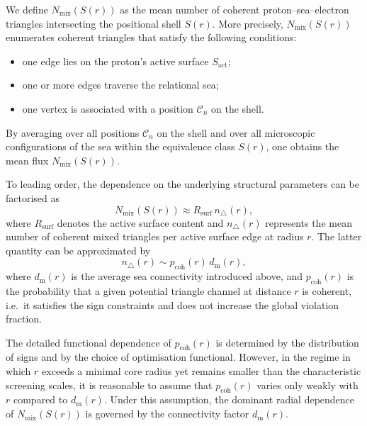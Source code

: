 \documentclass[11pt,a4paper]{article}
\begin{document}
We define $N_{\mathrm{mix}}(S(r))$ as the mean number of coherent proton–sea–electron triangles intersecting the positional shell $S(r)$.
More precisely, $N_{\mathrm{mix}}(S(r))$ enumerates coherent triangles that satisfy the following conditions:
\begin{itemize}
  \item one edge lies on the proton’s active surface $S_{\mathrm{act}}$;
  \item one or more edges traverse the relational sea;
  \item one vertex is associated with a position $\mathcal{C}_{n}$ on the shell.\cite{Laubscher2026SchrodingerSketch}
\end{itemize}
By averaging over all positions $\mathcal{C}_{n}$ on the shell and over all microscopic configurations of the sea within the equivalence class $S(r)$, one obtains the mean flux $N_{\mathrm{mix}}(S(r))$.

To leading order, the dependence on the underlying structural parameters can be factorised as
\begin{equation}
N_{\mathrm{mix}}(S(r)) \approx R_{\mathrm{surf}}\,n_{\triangle}(r),
\label{eq:NmixFactorisation}
\end{equation}
where $R_{\mathrm{surf}}$ denotes the active surface content and $n_{\triangle}(r)$ represents the mean number of coherent mixed triangles per active surface edge at radius $r$.
The latter quantity can be approximated by
\begin{equation}
n_{\triangle}(r) \sim p_{\mathrm{coh}}(r)\,d_{\mathrm{m}}(r),
\label{eq:ntriangler}
\end{equation}
where $d_{\mathrm{m}}(r)$ is the average sea connectivity introduced above, and $p_{\mathrm{coh}}(r)$ is the probability that a given potential triangle channel at distance $r$ is coherent, i.e.\ it satisfies the sign constraints and does not increase the global violation fraction.\cite{Laubscher2026FullPDL,Laubscher2026SchrodingerSketch}

The detailed functional dependence of $p_{\mathrm{coh}}(r)$ is determined by the distribution of signs and by the choice of optimisation functional.
However, in the regime in which $r$ exceeds a minimal core radius yet remains smaller than the characteristic screening scales, it is reasonable to assume that $p_{\mathrm{coh}}(r)$ varies only weakly with $r$ compared to $d_{\mathrm{m}}(r)$.
Under this assumption, the dominant radial dependence of $N_{\mathrm{mix}}(S(r))$ is governed by the connectivity factor $d_{\mathrm{m}}(r)$.
\end{document}
